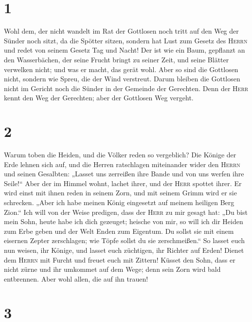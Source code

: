 \hypertarget{section}{%
\section{1}\label{section}}

 Wohl dem, der nicht wandelt im Rat der Gottlosen noch
tritt auf den Weg der Sünder noch sitzt, da die Spötter sitzen,
 sondern hat Lust zum Gesetz des \textsc{Herrn} und redet
von seinem Gesetz Tag und Nacht!  Der ist wie ein Baum,
gepflanzt an den Wasserbächen, der seine Frucht bringt zu seiner Zeit,
und seine Blätter verwelken nicht; und was er macht, das gerät wohl.
 Aber so sind die Gottlosen nicht, sondern wie Spreu, die
der Wind verstreut.  Darum bleiben die Gottlosen nicht im
Gericht noch die Sünder in der Gemeinde der Gerechten. 
Denn der \textsc{Herr} kennt den Weg der Gerechten; aber der Gottlosen
Weg vergeht.

\hypertarget{section-1}{%
\section{2}\label{section-1}}

 Warum toben die Heiden, und die Völker reden so
vergeblich?  Die Könige der Erde lehnen sich auf, und die
Herren ratschlagen miteinander wider den \textsc{Herrn} und seinen
Gesalbten:  „Lasset uns zerreißen ihre Bande und von uns
werfen ihre Seile!{}``  Aber der im Himmel wohnt, lachet
ihrer, und der \textsc{Herr} spottet ihrer.  Er wird einst
mit ihnen reden in seinem Zorn, und mit seinem Grimm wird er sie
schrecken.  „Aber ich habe meinen König eingesetzt auf
meinem heiligen Berg Zion.``  Ich will von der Weise
predigen, dass der \textsc{Herr} zu mir gesagt hat: „Du bist mein Sohn,
heute habe ich dich gezeuget;  heische von mir, so will
ich dir Heiden zum Erbe geben und der Welt Enden zum Eigentum.
 Du sollst sie mit einem eisernen Zepter zerschlagen; wie
Töpfe sollst du sie zerschmeißen.``  So lasset euch nun
weisen, ihr Könige, und lasset euch züchtigen, ihr Richter auf Erden!
 Dienet dem \textsc{Herrn} mit Furcht und freuet euch mit
Zittern!  Küsset den Sohn, dass er nicht zürne und ihr
umkommet auf dem Wege; denn sein Zorn wird bald entbrennen. Aber wohl
allen, die auf ihn trauen!

\hypertarget{section-2}{%
\section{3}\label{section-2}}

